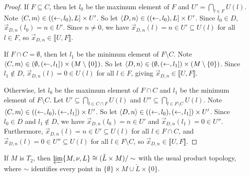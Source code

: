 \documentclass[11pt]{article}
\newcommand{\vect}{\vec}
\newcommand{\lb}{\llbracket}
\newcommand{\rb}{\rrbracket}
\begin{document}
\begin{proof}
    If \(F\subseteq C\), then let \(l_0\) be the maximum element of \(F\) and
    \(U'=\bigcap_{l\in F}U(l)\). Note \(\langle C,m\rangle\in((\leftarrow,l_0),L]\times U'\).
    So let \(\langle D,n\rangle\in((\leftarrow,l_0),L]\times U'\). Since \(l_0\in D\),
    \(\vect x_{D,n}(l_0)=n\in U'\). Since \(n\not=0\), we have
    \(\vect x_{D,n}(l)=n\in U'\subseteq U(l)\) for all \(l\in F\), so
    \(\vect x_{D,n}\in\lb U,F\rb\).

    If \(F\cap C=\emptyset\), then
    let \(l_1\) be the minimum element of \(F\setminus C\).
    Note \(\langle C,m\rangle\in(\emptyset,(\leftarrow,l_1])\times (M\setminus \{0\})\).
    So let \(\langle D,n\rangle\in(\emptyset,(\leftarrow,l_1])\times (M\setminus \{0\})\).
    Since \(l_1\not\in D\), \(\vect x_{D,n}(l)=0\in U(l)\) for all \(l\in F\),
    giving \(\vect x_{D,n}\in\lb U,F\rb\).

    Otherwise, let \(l_0\) be the maximum element of \(F\cap C\) and
    \(l_1\) be the minimum element of \(F\setminus C\).
    Let \(U'\subseteq \bigcap_{l\in C\cap F}U(l)\) and
    \(U''\subseteq \bigcap_{l\in F\setminus C}U(l)\).
    Note \(\langle C,m\rangle\in((\leftarrow,l_0),(\leftarrow,l_1])\times U'\).
    So let \(\langle D,n\rangle\in((\leftarrow,l_0),(\leftarrow,l_1])\times U'\).
    Since \(l_0\in D\) and \(l_1\not\in D\), we have
    \(\vect x_{D,n}(l_0)=n\in U'\) and
    \(\vect x_{D,n}(l_1)=0\in U''\). Furthermore,
    \(\vect x_{D,n}(l)=n\in U'\subseteq U(l)\) for all \(l\in F\cap C\), and
    \(\vect x_{D,n}(l)=0\in U''\subseteq U(l)\) for all \(l\in F\setminus C\),
    so \(\vect x_{D,n}\in\lb U,F\rb\).
  \end{proof}

  \begin{theorem}
    If \(M\) is \(T_2\), then
    \(
      \varprojlim\{M,\nu,L\}
        \cong
      (\check L\times M)/\sim
    \) with the usual product topology, where \(\sim\) identifies every
    point in \(\{\emptyset\}\times M\cup\check L\times \{0\}\).
  \end{theorem}
\end{document}
